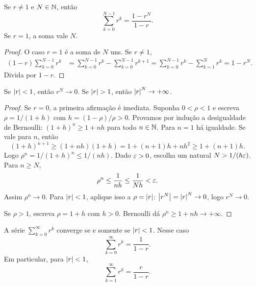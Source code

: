 \documentclass[11pt,a4paper]{article}
\begin{document}
\begin{teorema}
Se \(r\neq 1\) e \(N\in\mathbb{N}\), então
\[
\sum_{k=0}^{N-1} r^k=\frac{1-r^N}{1-r}.
\]
Se \(r=1\), a soma vale \(N\).
\end{teorema}

\begin{proof}
O caso \(r=1\) é a soma de \(N\) uns. Se \(r\neq 1\),
\begin{align*}
(1-r)\sum_{k=0}^{N-1} r^k
&=\sum_{k=0}^{N-1} r^k-\sum_{k=0}^{N-1} r^{k+1}
=\sum_{k=0}^{N-1} r^k-\sum_{k=1}^{N} r^k
=1-r^N.
\end{align*}
Divida por \(1-r\).
\end{proof}

\begin{lema}
Se \(\left\lvert r \right\rvert<1\), então \(r^N\to 0\). Se \(\left\lvert r \right\rvert>1\), então \(\left\lvert r \right\rvert^N\to+\infty\).
\end{lema}

\begin{proof}
Se \(r=0\), a primeira afirmação é imediata. Suponha \(0<\rho<1\) e escreva \(\rho=1/(1+h)\) com \(h=(1-\rho)/\rho>0\). Provamos por indução a desigualdade de Bernoulli: \((1+h)^n\ge 1+nh\) para todo \(n\in\mathbb{N}\). Para \(n=1\) há igualdade. Se vale para \(n\), então
\[
(1+h)^{n+1}\ge(1+nh)(1+h)=1+(n+1)h+nh^2\ge 1+(n+1)h.
\]
Logo \(\rho^n=1/(1+h)^n\le 1/(nh)\). Dado \(\varepsilon>0\), escolha um natural \(N>1/(h\varepsilon)\). Para \(n\ge N\),
\[
\rho^n\le\frac{1}{nh}\le\frac{1}{Nh}<\varepsilon.
\]
Assim \(\rho^n\to 0\). Para \(\left\lvert r \right\rvert<1\), aplique isso a \(\rho=\left\lvert r \right\rvert\): \(\left\lvert r^N \right\rvert=\left\lvert r \right\rvert^N\to 0\), logo \(r^N\to 0\).

Se \(\rho>1\), escreva \(\rho=1+h\) com \(h>0\). Bernoulli dá \(\rho^n\ge 1+nh\to+\infty\).
\end{proof}

\begin{teorema}
A série \(\sum_{k=0}^\infty r^k\) converge se e somente se \(\left\lvert r \right\rvert<1\). Nesse caso
\[
\sum_{k=0}^\infty r^k=\frac{1}{1-r}.
\]
Em particular, para \(\left\lvert r \right\rvert<1\),
\[
\sum_{k=1}^\infty r^k=\frac{r}{1-r}.
\]
\end{teorema}
\end{document}
